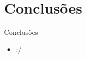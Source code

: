 \section{Conclusões}\label{sec:conclusoes}
\begin{frame}[allowframebreaks]{Conclusões}
	\begin{itemize}
		\setlength{\itemsep}{0.5em}
		\item :/
	\end{itemize}
\end{frame}